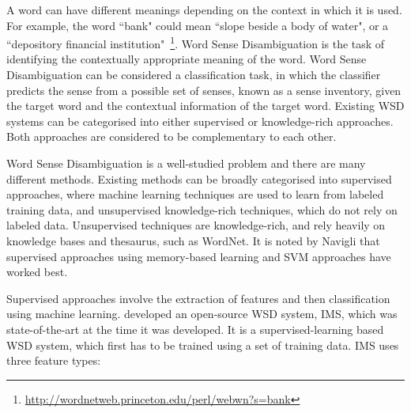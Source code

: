 \documentclass[11pt]{article}
\begin{document}
A word can have different meanings depending on the context in which it is used. For example, the word ``bank" could mean ``slope beside a body of water", or a ``depository financial institution"~\footnote{\url{http://wordnetweb.princeton.edu/perl/webwn?s=bank}}. Word Sense Disambiguation is the task of identifying the contextually appropriate meaning of the word. Word Sense Disambiguation can be considered a classification task, in which the classifier predicts the sense from a possible set of senses, known as a sense inventory, given the target word and the contextual information of the target word. Existing WSD systems can be categorised into either supervised or knowledge-rich approaches. Both approaches are considered to be complementary to each other. 


Word Sense Disambiguation is a well-studied problem and there are many different methods. Existing methods can be broadly categorised into supervised approaches, where machine learning techniques are used to learn from labeled training data, and unsupervised knowledge-rich techniques, which do not rely on labeled data. Unsupervised techniques are knowledge-rich, and rely heavily on knowledge bases and thesaurus, such as WordNet. It is noted by Navigli  that supervised approaches using memory-based learning and SVM approaches have worked best. 

Supervised approaches involve the extraction of features and then classification using machine learning.  developed an open-source WSD system, IMS, which was state-of-the-art at the time it was developed. It is a supervised-learning based WSD system, which first has to be trained using a set of training data. IMS uses three feature types:
\end{document}
